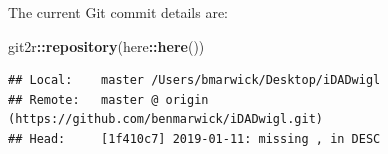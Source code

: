 \documentclass[]{elsarticle} %
\newenvironment{Shaded}{\begin{snugshade}}{\end{snugshade}}
\newcommand{\KeywordTok}[1]{\textcolor[rgb]{0.13,0.29,0.53}{\textbf{#1}}}
\newcommand{\NormalTok}[1]{#1}
\newcommand{\OperatorTok}[1]{\textcolor[rgb]{0.81,0.36,0.00}{\textbf{#1}}}
\begin{document}
The current Git commit details are:

\begin{Shaded}
\begin{Highlighting}[]
\NormalTok{git2r}\OperatorTok{::}\KeywordTok{repository}\NormalTok{(here}\OperatorTok{::}\KeywordTok{here}\NormalTok{())}
\end{Highlighting}
\end{Shaded}

\begin{verbatim}
## Local:    master /Users/bmarwick/Desktop/iDADwigl
## Remote:   master @ origin (https://github.com/benmarwick/iDADwigl.git)
## Head:     [1f410c7] 2019-01-11: missing , in DESC
\end{verbatim}
\end{document}
